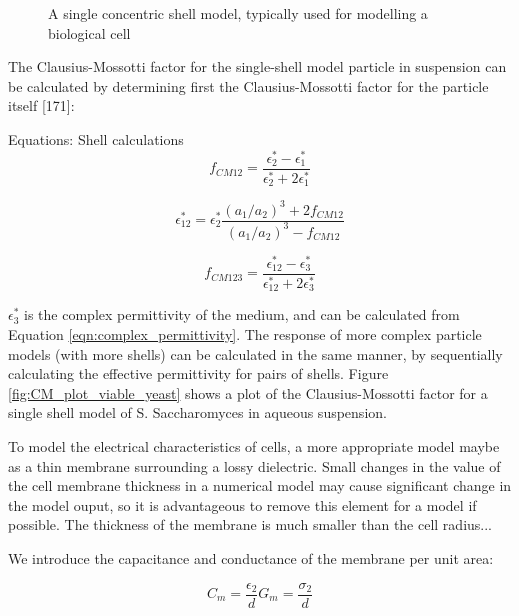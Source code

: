 \begin{figure}
 \centering
 \caption{A single concentric shell model, typically used for modelling a biological cell}
 \label{fig:cell_single_shell_model_diagram}
\end{figure}

The Clausius-Mossotti factor for the single-shell model particle in suspension can be calculated by determining first the Clausius-Mossotti factor for the particle itself [171]:

Equations: Shell calculations
\begin{equation}
 f_{CM12}=\frac{\epsilon_{2}^{*}-\epsilon_{1}^{*}}{\epsilon_{2}^{*}+2\epsilon_{1}^{*}}
\label{single_shell_1}
\end{equation}

\begin{equation}
 \epsilon_{12}^{*}=\epsilon_{2}^{*}\frac{(a_{1}/a_{2})^{3}+2f_{CM12}}{(a_{1}/a_{2})^{3}-f_{CM12}}
\label{single_shell_2}
\end{equation}

\begin{equation}
 f_{CM123}=\frac{\epsilon_{12}^{*}-\epsilon_{3}^{*}}{\epsilon_{12}^{*}+2\epsilon_{3}^{*}}
\label{single_shell_3}
\end{equation}

$\epsilon_{3}^{*}$ is the complex permittivity of the medium, and can be calculated from Equation \ref{eqn:complex_permittivity}. The response of more complex particle models (with more shells) can be calculated in the same manner, by sequentially calculating the effective permittivity for pairs of shells. Figure \ref{fig:CM_plot_viable_yeast} shows a plot of the Clausius-Mossotti factor for a single shell model of S. Saccharomyces in aqueous suspension.

To model the electrical characteristics of cells, a more appropriate model maybe as a thin membrane surrounding a lossy dielectric. Small changes in the value of the cell membrane thickness in a numerical model may cause significant change in the model ouput, so it is advantageous to remove this element for a model if possible. The thickness of the membrane is much smaller than the cell radius...

We introduce the capacitance and conductance of the membrane per unit area:

\begin{equation}
 C_{m} = \frac{\epsilon_{2}}{d}  G_{m} = \frac{\sigma_{2}}{d}
\end{equation}

